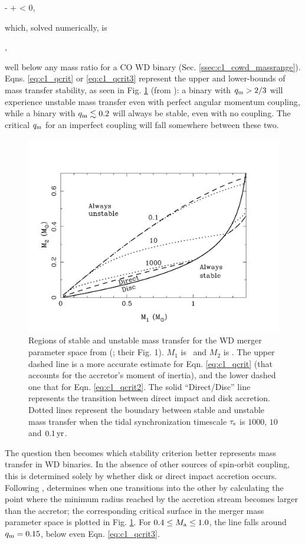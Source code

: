 \eqbegin
\qm-  +  < 0,
\label{eq:c1_qcrit2}
\eqend

\noindent which, solved numerically, is

\eqbegin
\qm{},
\label{eq:c1_qcrit3}
\eqend

\noindent well below any mass ratio for a CO WD binary (Sec. \ref{ssec:c1_cowd_massrange}).  Eqns. \ref{eq:c1_qcrit} or \ref{eq:c1_qcrit3} represent the upper and lower-bounds of mass transfer stability, as seen in Fig. \ref{fig:c1_stability} (from \citealt{marsns04}): a binary with $\qm > 2/3$ will experience unstable mass transfer even with perfect angular momentum coupling, while a binary with $\qm \lesssim 0.2$ will always be stable, even with no coupling.  The critical $\qm$ for an imperfect coupling will fall somewhere between these two.

\begin{figure}
\centering
\includegraphics[angle=0,width=0.65\columnwidth]{introduction/figures/marsns04_stab.pdf}
\caption{Regions of stable and unstable mass transfer for the WD merger parameter space from \citeauthor{marsns04} (\citeyear{marsns04}; their Fig. 1).  $M_1$ is \Ma\, and $M_2$ is \Md.  The upper dashed line is a more accurate estimate for Eqn. \ref{eq:c1_qcrit} (that accounts for the accretor's moment of inertia), and the lower dashed one that for Eqn. \ref{eq:c1_qcrit2}.  The solid ``Direct/Disc'' line represents the transition between direct impact and disk accretion.  Dotted lines represent the boundary between stable and unstable mass transfer when the tidal synchronization timescale $\tau_\mathrm{s}$ is $1000$, $10$ and $0.1\,\mathrm{yr}$.}
\label{fig:c1_stability}
\end{figure}

The question then becomes which stability criterion better represents mass transfer in WD binaries.  In the absence of other sources of spin-orbit coupling, this is determined solely by whether disk or direct impact accretion occurs.  Following \cite{lubos75}, \cite{nele+01} determines when one transitions into the other by calculating the point where the minimum radius reached by the accretion stream becomes larger than the accretor; the corresponding critical surface in the merger mass parameter space is plotted in Fig. \ref{fig:c1_stability}.  For $0.4 \leq \Ma \leq 1.0$, the line falls around $\qm = 0.15$, below even Eqn. \ref{eq:c1_qcrit3}.

